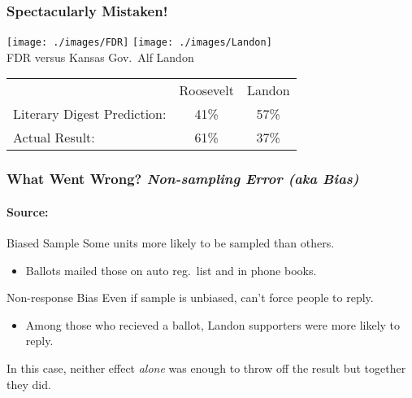 \begin{frame}
\frametitle{Spectacularly Mistaken!}

\begin{center}
\texttt{[image: ./images/FDR]}
\texttt{[image: ./images/Landon]}\\
\small FDR versus Kansas Gov.\ Alf Landon
\end{center}

\normalsize

\begin{table}
\begin{tabular}{lcc}
&Roosevelt&Landon\\
Literary Digest Prediction: &41\% & \alert{57\%}\\
Actual Result: &\alert{61\%} & 37\%

\end{tabular}

\end{table}

\end{frame}
\begin{frame}

\frametitle{What Went Wrong? \emph{Non-sampling Error (aka Bias)}}
\framesubtitle{Source: \href{http://www.jstor.org/stable/10.2307/2749114}{}}

\begin{block}{Biased Sample}
Some units more likely to be sampled than others.
	\begin{itemize}
		\item Ballots mailed those on auto reg.\ list and in phone books.
	\end{itemize}
\end{block}

\begin{block}{Non-response Bias}
Even if sample is unbiased, can't force people to reply.
	\begin{itemize}
		\item Among those who recieved a ballot, Landon supporters were more likely to reply.
	\end{itemize}
\end{block}
\alert{In this case, neither effect \emph{alone} was enough to throw off the result but together they did.}
\end{frame}
